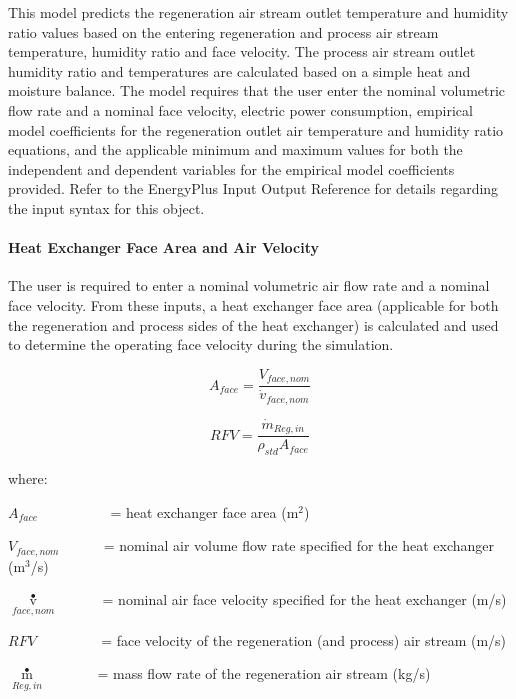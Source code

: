 This model predicts the regeneration air stream outlet temperature and humidity ratio values based on the entering regeneration and process air stream temperature, humidity ratio and face velocity. The process air stream outlet humidity ratio and temperatures are calculated based on a simple heat and moisture balance. The model requires that the user enter the nominal volumetric flow rate and a nominal face velocity, electric power consumption, empirical model coefficients for the regeneration outlet air temperature and humidity ratio equations, and the applicable minimum and maximum values for both the independent and dependent variables for the empirical model coefficients provided. Refer to the EnergyPlus Input Output Reference for details regarding the input syntax for this object.

\paragraph{Heat Exchanger Face Area and Air Velocity}\label{heat-exchanger-face-area-and-air-velocity}

The user is required to enter a nominal volumetric air flow rate and a nominal face velocity. From these inputs, a heat exchanger face area (applicable for both the regeneration and process sides of the heat exchanger) is calculated and used to determine the operating face velocity during the simulation.

\begin{equation}
  A_{face} = \frac{V_{face,nom}}{\dot{v}_{face,nom}}
\end{equation}

\begin{equation}
  RFV = \frac{\dot{m}_{Reg,in}}{\rho_{std}A_{face}}
\end{equation}

where:

\({A_{face}}\) ~~~~~~~~~ = heat exchanger face area (m\(^{2}\))

\({V_{face,nom}}\) ~~~~~ = nominal air volume flow rate specified for the heat exchanger (m\(^{3}\)/s)

\({\mathop v\limits^ \bullet_{face,nom}}\) ~~~~~ = nominal air face velocity specified for the heat exchanger (m/s)

\(RFV\) ~~~~~~~~ = face velocity of the regeneration (and process) air stream (m/s)

\({\mathop m\limits^ \bullet_{Reg,in}}\) ~~~~~~ = mass flow rate of the regeneration air stream (kg/s)

